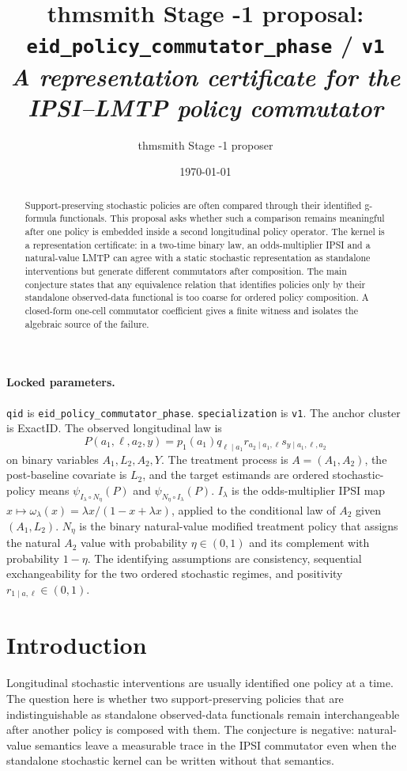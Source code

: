 \documentclass[11pt]{article}
\title{thmsmith Stage -1 proposal: \texttt{eid\_policy\_commutator\_phase} / \texttt{v1}%
  \\ \large\textit{A representation certificate for the IPSI--LMTP policy commutator}}
\author{thmsmith Stage -1 proposer}
\date{\today}
\theoremstyle{definition}
\theoremstyle{plain}
\theoremstyle{remark}
\begin{document}
\maketitle


\paragraph{Locked parameters.}
\texttt{qid} is \texttt{eid\_policy\_commutator\_phase}. \texttt{specialization} is \texttt{v1}. The anchor cluster is ExactID. The observed longitudinal law is
\[
P(a_1,\ell,a_2,y)=p_1(a_1)q_{\ell\mid a_1}r_{a_2\mid a_1,\ell}s_{y\mid a_1,\ell,a_2}
\]
on binary variables \(A_1,L_2,A_2,Y\). The treatment process is \(A=(A_1,A_2)\), the post-baseline covariate is \(L_2\), and the target estimands are ordered stochastic-policy means \(\psi_{I_\lambda\circ N_\eta}(P)\) and \(\psi_{N_\eta\circ I_\lambda}(P)\). \(I_\lambda\) is the odds-multiplier IPSI map \(x\mapsto \omega_\lambda(x)=\lambda x/(1-x+\lambda x)\), applied to the conditional law of \(A_2\) given \((A_1,L_2)\). \(N_\eta\) is the binary natural-value modified treatment policy that assigns the natural \(A_2\) value with probability \(\eta\in(0,1)\) and its complement with probability \(1-\eta\). The identifying assumptions are consistency, sequential exchangeability for the two ordered stochastic regimes, and positivity \(r_{1\mid a,\ell}\in(0,1)\).

\begin{abstract}
Support-preserving stochastic policies are often compared through their identified g-formula functionals. This proposal asks whether such a comparison remains meaningful after one policy is embedded inside a second longitudinal policy operator. The kernel is a representation certificate: in a two-time binary law, an odds-multiplier IPSI and a natural-value LMTP can agree with a static stochastic representation as standalone interventions but generate different commutators after composition. The main conjecture states that any equivalence relation that identifies policies only by their standalone observed-data functional is too coarse for ordered policy composition. A closed-form one-cell commutator coefficient gives a finite witness and isolates the algebraic source of the failure.
\end{abstract}

\section{Introduction}
Longitudinal stochastic interventions are usually identified one policy at a time. The question here is whether two support-preserving policies that are indistinguishable as standalone observed-data functionals remain interchangeable after another policy is composed with them. The conjecture is negative: natural-value semantics leave a measurable trace in the IPSI commutator even when the standalone stochastic kernel can be written without that semantics.
\end{document}
